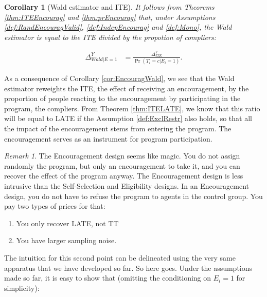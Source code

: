 \documentclass[
]{book}
\providecommand{\tightlist}{%
  \setlength{\itemsep}{0pt}\setlength{\parskip}{0pt}}
\newtheorem{corollary}{Corollary}[chapter]
\theoremstyle{definition}
\theoremstyle{definition}
\theoremstyle{definition}
\theoremstyle{definition}
\theoremstyle{remark}
\newtheorem*{remark}{Remark}
\begin{document}
\begin{corollary}[Wald estimator and ITE]
\protect\hypertarget{cor:EncouragWald}{}{\label{cor:EncouragWald} \iffalse (Wald estimator and ITE) \fi{} }It follows from Theorems \ref{thm:ITEEncourag} and \ref{thm:prEncourag} that, under Assumptions \ref{def:RandEncouragValid}, \ref{def:IndepEncourag} and \ref{def:Mono}, the Wald estimator is equal to the ITE divided by the propotion of compliers:

\begin{align*}
  \Delta^Y_{Wald|E=1} & = \frac{\Delta^Y_{ITE}}{\Pr(T_i=c|E_i=1)}.
\end{align*}
\end{corollary}

As a consequence of Corollary \ref{cor:EncouragWald}, we see that the Wald estimator reweights the ITE, the effect of receiving an encouragement, by the proportion of people reacting to the encouragement by participating in the program, the compliers.
From Theorem \ref{thm:ITELATE}, we know that this ratio will be equal to LATE if the Assumption \ref{def:ExclRestr} also holds, so that all the impact of the encouragement stems from entering the program.
The encouragement serves as an instrument for program participation.

\begin{remark}
\iffalse{} {Remark. } \fi{}The Encouragement design seems like magic.
You do not assign randomly the program, but only an encouragement to take it, and you can recover the effect of the program anyway.
The Encouragement design is less intrusive than the Self-Selection and Eligibility designs.
In an Encouragement design, you do not have to refuse the program to agents in the control group.
You pay two types of prices for that:
\end{remark}

\begin{enumerate}
\def\labelenumi{\arabic{enumi}.}
\tightlist
\item
  You only recover LATE, not TT
\item
  You have larger sampling noise.
\end{enumerate}

The intuition for this second point can be delineated using the very same apparatus that we have developed so far.
So here goes.
Under the assumptions made so far, it is easy to show that (omitting the conditioning on \(E_i=1\) for simplicity):
\end{document}

